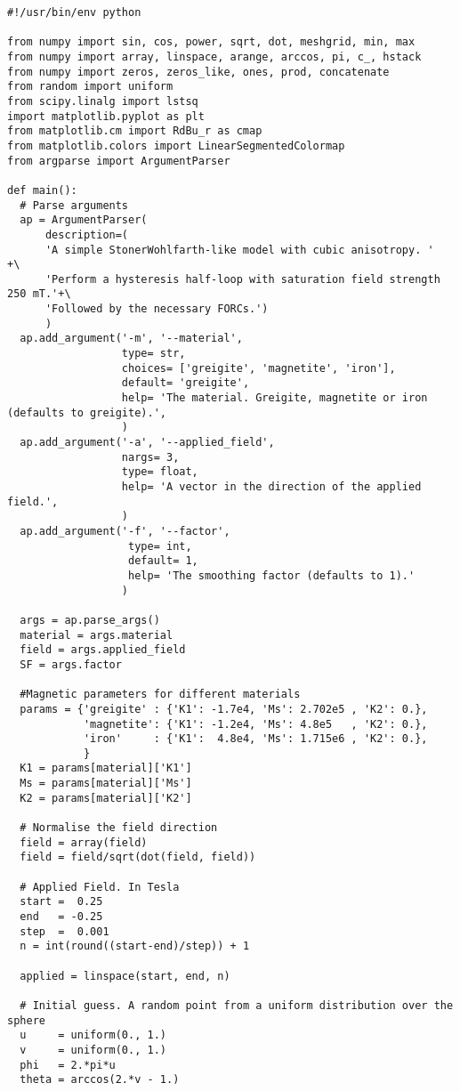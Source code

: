 \begin{lstlisting}
#!/usr/bin/env python

from numpy import sin, cos, power, sqrt, dot, meshgrid, min, max
from numpy import array, linspace, arange, arccos, pi, c_, hstack
from numpy import zeros, zeros_like, ones, prod, concatenate
from random import uniform
from scipy.linalg import lstsq
import matplotlib.pyplot as plt
from matplotlib.cm import RdBu_r as cmap
from matplotlib.colors import LinearSegmentedColormap
from argparse import ArgumentParser

def main():
  # Parse arguments
  ap = ArgumentParser(
      description=(
      'A simple StonerWohlfarth-like model with cubic anisotropy. '          +\
      'Perform a hysteresis half-loop with saturation field strength 250 mT.'+\
      'Followed by the necessary FORCs.')
      )
  ap.add_argument('-m', '--material',
                  type= str,
                  choices= ['greigite', 'magnetite', 'iron'],
                  default= 'greigite',
                  help= 'The material. Greigite, magnetite or iron (defaults to greigite).',
                  )
  ap.add_argument('-a', '--applied_field',
                  nargs= 3,
                  type= float,
                  help= 'A vector in the direction of the applied field.',
                  )
  ap.add_argument('-f', '--factor',
                   type= int,
                   default= 1,
                   help= 'The smoothing factor (defaults to 1).'
                  )

  args = ap.parse_args()
  material = args.material
  field = args.applied_field
  SF = args.factor

  #Magnetic parameters for different materials
  params = {'greigite' : {'K1': -1.7e4, 'Ms': 2.702e5 , 'K2': 0.},
            'magnetite': {'K1': -1.2e4, 'Ms': 4.8e5   , 'K2': 0.},
            'iron'     : {'K1':  4.8e4, 'Ms': 1.715e6 , 'K2': 0.},
            }
  K1 = params[material]['K1']
  Ms = params[material]['Ms']
  K2 = params[material]['K2']

  # Normalise the field direction
  field = array(field)
  field = field/sqrt(dot(field, field))

  # Applied Field. In Tesla
  start =  0.25
  end   = -0.25
  step  =  0.001
  n = int(round((start-end)/step)) + 1

  applied = linspace(start, end, n)

  # Initial guess. A random point from a uniform distribution over the sphere
  u     = uniform(0., 1.)
  v     = uniform(0., 1.)
  phi   = 2.*pi*u
  theta = arccos(2.*v - 1.)


\end{lstlisting}
